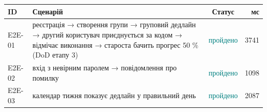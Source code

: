 \begin{longtable}{@{}l L{10.6cm} c r@{}}
\toprule
ID & Сценарій & Статус & мс\\
\midrule\endhead
E2E-01 & реєстрація → створення групи → груповий дедлайн → другий користувач приєднується за кодом → відмічає виконання → староста бачить прогрес 50 \% (DoD етапу 3) & \textcolor{teal}{пройдено} & 3741\\
E2E-02 & вхід з невірним паролем → повідомлення про помилку & \textcolor{teal}{пройдено} & 1098\\
E2E-03 & календар тижня показує дедлайн у правильний день & \textcolor{teal}{пройдено} & 2087\\
\bottomrule
\end{longtable}
